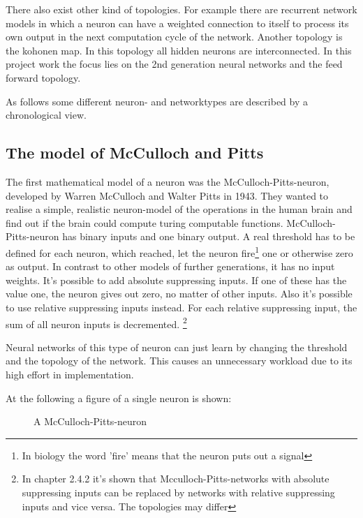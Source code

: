 \documentclass[10pt,a4paper,DIV=11]{scrreprt}
\begin{document}
There also exist other kind of topologies. For example there are recurrent network models in which a neuron can have a weighted connection to itself to process its own output in the next computation cycle of the network. Another topology is the kohonen map. In this topology all hidden neurons are interconnected. In this project work the focus lies on the 2nd generation neural networks and the feed forward topology.


As follows some different neuron- and networktypes are described by a chronological view.
\subsection{The model of McCulloch and Pitts}
\label{sec:pitts}
The first mathematical model of a neuron was the McCulloch-Pitts-neuron,
developed by Warren McCulloch and Walter Pitts in 1943.\cite{NEURONMATH}
They wanted to realise a simple, realistic neuron-model of the operations in the human brain and find out if the brain could compute turing computable functions.
McCulloch-Pitts-neuron has binary inputs and one binary output.
A real threshold has to be defined for each neuron, which reached, let the neuron fire\footnote{In biology the word 'fire' means that the neuron puts out a signal} one or otherwise zero as output.
In contrast to other models of further generations, it has no input weights.
It's possible to add absolute suppressing inputs. If one of these has the value one, the neuron gives out zero, no matter of other inputs.
Also it's possible to use relative suppressing inputs instead. For each relative suppressing input, the sum of all neuron inputs is decremented.
\footnote{In \cite{rojas} chapter 2.4.2 it's shown that Mcculloch-Pitts-networks with absolute suppressing inputs can be replaced by networks with relative suppressing inputs and vice versa. The topologies may differ}


Neural networks of this type of neuron can just learn by changing the threshold and the topology of the network. This causes an unnecessary workload due to its high effort in implementation.

At the following a figure of a single neuron is shown:

\begin{figure}[H]  %
	\centering
	\caption{A McCulloch-Pitts-neuron}
	\label{fig:pitts1}
\end{figure}
\end{document}
